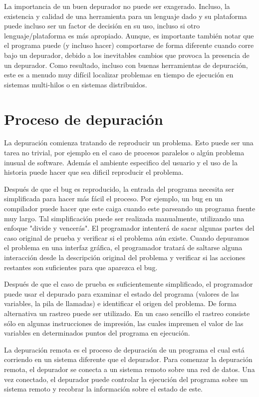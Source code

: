 \documentclass[12pt,a4paper]{report}
\begin{document}
La importancia de un buen depurador no puede ser exagerado.  Incluso, la existencia y calidad de una herramienta para un lenguaje dado y su plataforma puede incluso ser un factor de decisión en su uso, incluso si otro lenguaje/plataforma es más apropiado.  Aunque, es importante también notar que el programa puede (y incluso hacer) comportarse de forma diferente cuando corre bajo un depurador, debido a los inevitables cambios que provoca la presencia de un depurador.  Como resultado, incluso con buenas herramientas de depuración, este es a menudo muy difícil localizar problemas en tiempo de ejecución en sistemas multi-hilos o en sistemas distribuidos.


	\section*{Proceso de depuración}

La depuración comienza tratando de reproducir un problema.  Esto puede ser una tarea no trivial, por ejemplo en el caso de procesos paralelos o algún problema inusual de software.  Además el ambiente especifico del usuario y el uso de la historia puede hacer que sea dificil reproducir el problema.


Después de que el bug es reproducido, la entrada del programa necesita ser simplificada para hacer más fácil el proceso.  Por ejemplo, un bug en un compilador puede hacer que este caiga cuando este parseando un programa fuente muy largo.  Tal simplificación puede ser realizada manualmente, utilizando una enfoque "divide y vencerás".  El programador intenterá de sacar algunas partes del caso original de prueba y verificar si el problema aún existe.  Cuando depuramos el problema en una interfaz gráfica, el programador tratará de saltarse alguna interacción  desde la descripción original del problema y verificar si las acciones restantes son suficientes para que aparezca el bug.


Después de que el caso de prueba es suficientemente simplificado, el programador puede usar el depurado para examinar el estado del programa (valores de las variables, la pila de llamadas) e identificar el origen del problema.  De forma alternativa un rastreo puede ser utilizado.  En un caso sencillo el rastreo consiste sólo en algunas instrucciones de impresión, las cuales impremen el valor de las variables en determinados puntos del programa en ejecución.


La depuración remota es el proceso de depuración de un programa el cual está corriendo en un sistema diferente que el depurador.  Para comenzar la depuración remota, el depurador se conecta a un sistema remoto sobre una red de datos.  Una vez conectado, el depurador puede controlar la ejecución del programa  sobre un sistema remoto y recobrar la información sobre el estado de este.
\end{document}
